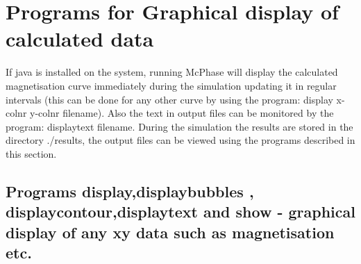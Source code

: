 
\section{Programs for Graphical display of calculated data}
\label{graphics}

If java is installed on the system, running McPhase will
 display the calculated magnetisation
curve immediately during the simulation updating 
it in regular intervals (this can be done for any other
curve  by using the
program: {\prg display x-colnr y-colnr filename}). 
Also the text in output files can be monitored by the program:
{\prg displaytext filename}.
During the simulation
the results are stored in the directory {\prg ./results}, the output files can be viewed 
using the programs described in this section. 

\subsection{Programs {\prg display},{\prg displaybubbles },{\prg %
displaycontour},{\prg displaytext} and {\prg show} - graphical %
display of any xy data such as magnetisation etc.}
\label{display}

